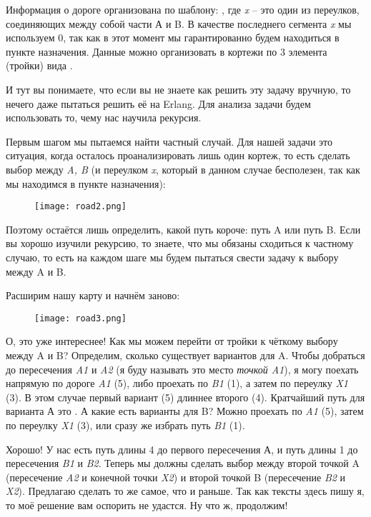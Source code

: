 Информация о дороге организована по шаблону:
, где \emph{x} \--- это один из переулков, соединяющих между собой части А и B.
В качестве последнего сегмента \emph{x} мы используем 0, так как в этот момент мы гарантированно будем находиться в пункте назначения.
Данные можно организовать в кортежи по 3 элемента (тройки) вида .

И тут вы понимаете, что если вы не знаете как решить эту задачу вручную, то нечего даже пытаться решить её на Erlang.
Для анализа задачи будем использовать то, чему нас научила рекурсия.

Первым шагом мы пытаемся найти частный случай.
Для нашей задачи это ситуация, когда осталось проанализировать лишь один кортеж, то есть сделать выбор между \emph{A, B} (и переулком \emph{x}, который в данном случае бесполезен, так как мы находимся в пункте назначения):
\begin{figure}[h!]
    \centering
    \texttt{[image: road2.png]}
\end{figure}

Поэтому остаётся лишь определить, какой путь короче: путь A или путь B.
Если вы хорошо изучили рекурсию, то знаете, что мы обязаны сходиться к частному случаю, то есть на каждом шаге мы будем пытаться свести задачу к выбору между A и B.

Расширим нашу карту и начнём заново:
\begin{figure}[h!]
    \centering
    \texttt{[image: road3.png]}
\end{figure}

О, это уже интереснее!
Как мы можем перейти от тройки  к чёткому выбору между A и B?
Определим, сколько существует вариантов для A.
Чтобы добраться до пересечения \emph{A1} и \emph{A2} (я буду называть это место \emph{точкой A1}), я могу поехать напрямую по дороге \emph{A1} (5), либо проехать по \emph{B1} (1), а затем по переулку \emph{X1} (3).
В этом случае первый вариант (5) длиннее второго (4).
Кратчайший путь для варианта А это \ops{[B, X]}.
А какие есть варианты для B?
Можно проехать по \emph{A1} (5), затем по переулку \emph{X1} (3), или сразу же избрать путь \emph{B1} (1).

Хорошо!
У нас есть путь длины 4 \ops{[B, X]} до первого пересечения А, и путь длины 1 \ops{[B]} до пересечения \emph{B1} и \emph{B2}.
Теперь мы должны сделать выбор между второй точкой A (пересечение \emph{A2} и конечной точки \emph{X2}) и второй точкой B (пересечение \emph{B2} и \emph{X2}).
Предлагаю сделать то же самое, что и раньше.
Так как тексты здесь пишу я, то моё решение вам оспорить не удастся.
Ну что ж, продолжим!

